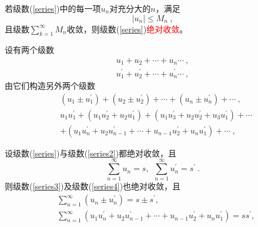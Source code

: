\documentclass[11pt,a4paper]{article}
\begin{document}
\begin{tcolorbox}[colback=green!5,colframe=green!40!black,title= 定理]
若级数(\ref{series})中的每一项$u_n$对充分大的$n$，满足
\begin{equation}
|u_{n}| \leqslant M_n ~,
\end{equation}
且级数$\sum\limits_{k=1}^\infty M_n$收敛，则级数(\ref{series})\textcolor{red}{绝对收敛}。
\end{tcolorbox}

设有两个级数
\begin{align}
u_1 +u_2 +\cdots +u_n \cdots ~, \\
u^\prime_1 +u^\prime_2 +\cdots +u^\prime_n \cdots ~,
\label{series2}
\end{align}
由它们构造另外两个级数
\begin{align}
\label{series3}
& (u_1 \pm u^\prime_1) +(u_2 \pm u^\prime_2) +\cdots +(u_n \pm u^\prime_n) +\cdots ~, \\
\nonumber & u_1u^\prime_1 +(u_1u^\prime_2 +u_2 u^\prime_1) +(u_1u^\prime_3 +u_2 u^\prime_2 +u_3u^\prime_1) +\cdots \\
& +(u_1u^\prime_n +u_2 u^\prime_{n-1} +\cdots +u_{n-1}u^\prime_2 +u_n u^\prime_1) +\cdots ~,
\label{series4}
\end{align}


\begin{tcolorbox}[colback=green!5,colframe=green!40!black,title= 定理]
设级数(\ref{series})与级数(\ref{series2})都绝对收敛，且
\begin{equation}
\sum_{n=1}^\infty u_n = s, ~~ \sum_{n=1}^\infty u^\prime_n = s^\prime ~.
\end{equation}
则级数(\ref{series3})及级数(\ref{series4})也绝对收敛，且
\begin{align}
& \sum_{n=1}^\infty (u_n \pm u^\prime_n) = s \pm s^\prime, \\
& \sum_{n=1}^\infty (u_1u^\prime_n +u_2u^\prime_{n-1} +\cdots +u_{n-1}u^\prime_{2} +u_{n}u^\prime_{1}) = s s^\prime, 
\end{align}
\end{tcolorbox}
\end{document}
